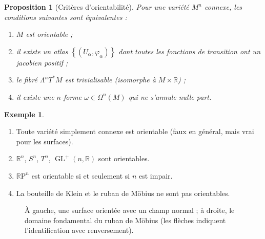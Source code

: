 \documentclass[12pt,a4paper,openany]{book}
\theoremstyle{definition}
\newtheorem{exemple}[definition]{Exemple}
\theoremstyle{plain}
\newtheorem{proposition}[definition]{Proposition}
\theoremstyle{remark}
\newcommand{\R}{\mathbb{R}}
\newcommand{\RP}{\mathbb{R}\mathrm{P}}
\DeclareMathOperator{\GL}{GL}
\newcommand{\set}[1]{\left\{#1\right\}}
\begin{document}
\begin{proposition}[Critères d'orientabilité]\label{prop:criteres-orientabilite}%
Pour une variété $M^n$ connexe, les conditions suivantes sont
équivalentes :
\begin{enumerate}[label=\textup{(\roman*)}]
  \item $M$ est orientable ;
  \item il existe un atlas $\set{(U_\alpha, \varphi_\alpha)}$ dont
    toutes les fonctions de transition ont un jacobien positif ;
  \item le fibré $\Lambda^n T^*M$ est trivialisable (isomorphe à
    $M \times \R$) ;
  \item il existe une $n$-forme $\omega \in \Omega^n(M)$ qui ne
    s'annule nulle part.
\end{enumerate}
\end{proposition}

\begin{exemple}\label{ex:orientabilite}
\begin{enumerate}[label=\textup{(\alph*)}]
  \item Toute variété simplement connexe est orientable (faux en
    général, mais vrai pour les surfaces).
  \item $\R^n$, $S^n$, $T^n$, $\GL^+(n, \R)$ sont orientables.
  \item $\RP^n$ est orientable si et seulement si $n$ est impair.
  \item La bouteille de Klein et le ruban de
    Möbius ne sont pas orientables.
\end{enumerate}
\end{exemple}

\begin{figure}[ht]
\centering
{}
\caption{À gauche, une surface orientée avec un champ normal ;
  à droite, le domaine fondamental du ruban de Möbius
  (les flèches indiquent l'identification avec renversement).}
\label{fig:orientation}
\end{figure}
\end{document}
